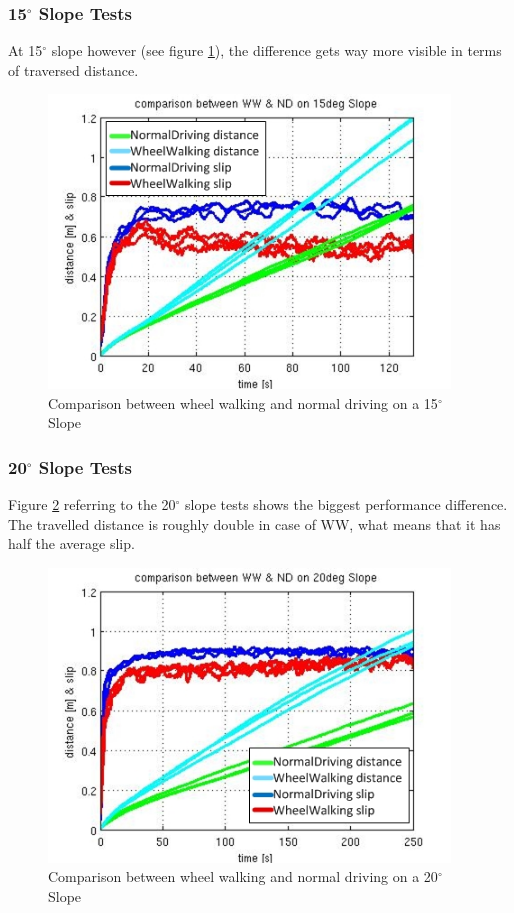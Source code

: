 \documentclass[a4paper,twocolumn]{esapub2005} %
\begin{document}
\subsubsection*{15$^{\circ}$ Slope Tests}
At 15$^\circ$ slope however (see figure \ref{fig:15d}), the difference gets way
more visible in terms of traversed distance.  

\begin{figure}[h!]
    \centering
    \includegraphics[width=0.95\textwidth]{15dega2.jpg}	\caption{Comparison between
    wheel walking and normal driving on a 15$^{\circ}$ Slope} \label{fig:15d}
\end{figure}

\subsubsection*{20$^{\circ}$ Slope Tests}
Figure \ref{fig:20d} referring to the 20$^\circ$ slope tests shows the biggest
performance difference. The travelled distance is roughly double in case of WW,
what means that it has half the average slip. 

\begin{figure}[h!]
    \centering
    \includegraphics[width=0.95\textwidth]{20dega2.jpg}	\caption{Comparison between
    wheel walking and normal driving on a 20$^{\circ}$ Slope} \label{fig:20d}
\end{figure}
\end{document}
